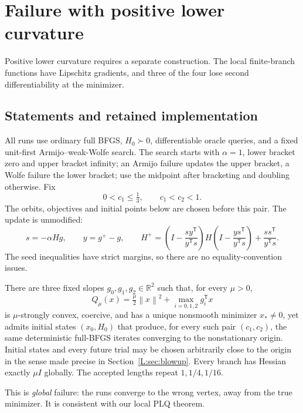 \chapter{Failure with positive lower curvature}\label{comp:L}\label{L:chapter}
\renewcommand{\ModuleTag}{13}
Positive lower curvature requires a separate construction. The local finite-branch functions have Lipschitz gradients, and three of the four lose second differentiability at the minimizer.


\begingroup
\providecommand{\R}{}
\renewcommand{\R}{\mathbb R}
\providecommand{\T}{}
\renewcommand{\T}{^{\mathsf T}}
\providecommand{\norm}{}
\renewcommand{\norm}[1]{\left\lVert#1\right\rVert}
\providecommand{\ip}{}
\renewcommand{\ip}[2]{\langle #1,#2\rangle}
\setcounter{section}{0}
\setcounter{theorem}{0}
\setcounter{lemma}{0}
\setcounter{corollary}{0}
\setcounter{proposition}{0}
\setcounter{remark}{0}
\setcounter{equation}{0}


\section{Statements and retained implementation}

All runs use ordinary full BFGS, $H_0\succ0$, differentiable oracle queries, and a fixed unit-first Armijo--weak-Wolfe search. The search starts with $\alpha=1$, lower bracket zero and upper bracket infinity; an Armijo failure updates the upper bracket, a Wolfe failure the lower bracket; use the midpoint after bracketing and doubling otherwise. Fix
\[
 0<c_1\le\tfrac13,\qquad c_1<c_2<1.
\]
The orbits, objectives and initial points below are chosen before this pair.
The update is unmodified:
\[
 s=-\alpha Hg,\qquad y=g^+-g,\qquad
 H^+=\left(I-\frac{sy\T}{y\T s}\right)H
 \left(I-\frac{ys\T}{y\T s}\right)+\frac{ss\T}{y\T s}.
\]
The seed inequalities have strict margins, so there are no equality-convention issues.

\begin{theorem}\label{L:thm:global}
There are three fixed slopes $g_0,g_1,g_2\in\R^2$ such that, for every $\mu>0$,
\[
 Q_\mu(x)=\tfrac\mu2\norm{x}^2+\max_{i=0,1,2}g_i\T x
\]
is $\mu$-strongly convex, coercive, and has a unique nonsmooth minimizer $x_*\ne0$, yet admits initial states $(x_0,H_0)$ that produce, for every such pair $(c_1,c_2)$, the same deterministic full-BFGS iterates converging to the nonstationary origin. Initial states and every future trial may be chosen arbitrarily close to the origin in the sense made precise in Section~\ref{L:sec:blowup}. Every branch has Hessian exactly $\mu I$ globally. The accepted lengths repeat $1,1/4,1/16$.
\end{theorem}
\noindent This is \emph{global} failure: the runs converge to the wrong vertex, away from the true minimizer. It is consistent with our local PLQ theorem.

